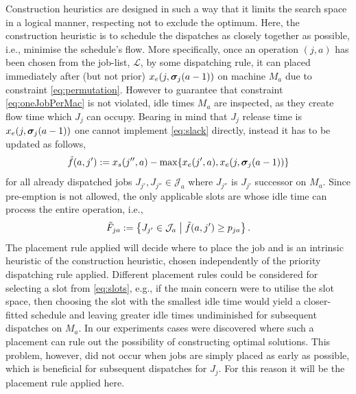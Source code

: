 \documentclass[smallextended]{svjour3}
\begin{document}
Construction heuristics are designed in such a way that it limits the search 
space in a logical manner, respecting not to exclude the optimum. Here, the 
construction heuristic is to schedule the dispatches as closely together as 
possible, i.e., minimise the schedule's flow. 
More specifically, once an operation $(j,a)$ has been chosen from the job-list, 
$\mathcal{L}$, by some dispatching rule, it can placed immediately after (but 
not prior) $x_e(j,\bm \sigma_j(a-1))$ on machine $M_a$ due to constraint 
\cref{eq:permutation}. 
However to guarantee that constraint \cref{eq:oneJobPerMac} is not violated, 
idle times $M_a$ are inspected, as they create flow time  which $J_j$ can 
occupy. Bearing in mind that $J_j$ release time is $x_e(j,\bm \sigma_j(a-1))$ one 
cannot implement \cref{eq:slack} directly, instead it has to be updated as 
follows,
\begin{equation}
\tilde{f}(a,j'):= x_s(j'',a)-\max\{x_e(j',a),x_e(j,\vsigma_j(a-1))\} %
\end{equation}
for all already dispatched jobs $J_{j'},J_{j''}\in \mathcal{J}_a$ where 
$J_{j''}$ is $J_{j'}$ successor on $M_a$. Since pre-emption is not allowed, the 
only applicable slots are whose idle time can process the entire operation, 
i.e.,
\begin{equation}
\tilde{F}_{ja} := \left\{J_{j'}\in \mathcal{J}_a\;\middle|\;\tilde{f}(a,j')\geq p_{ja} 
\right\}\label{eq:slots}.
\end{equation} 
The placement rule applied will decide where to place the job and 
is an intrinsic heuristic of the construction heuristic, chosen independently 
of the priority dispatching rule applied. 
Different placement rules could be considered for selecting a slot from 
\cref{eq:slots}, e.g., if the main concern were to utilise the slot space, then 
choosing the slot with the smallest idle time would yield a closer-fitted 
schedule and leaving greater idle times undiminished for subsequent dispatches 
on $M_a$.
In our experiments cases were discovered where such a placement can rule out 
the possibility of constructing optimal solutions.
This problem, however, did not occur when jobs are simply placed as early as 
possible, which is beneficial for subsequent dispatches for $J_j$. 
For this reason it will be the placement rule applied here.
\end{document}
